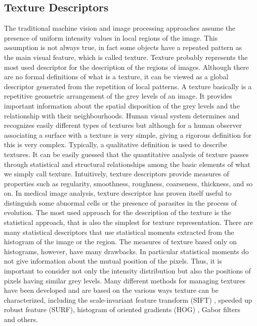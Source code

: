 \documentclass[final,a4paper,12pt,english]{UnicaPhdThesis3}
\begin{document}
\subsection{Texture Descriptors} %
The traditional machine vision and image processing approaches assume the presence of uniform intensity values in local regions of the image. This assumption is not always true, in fact some objects have a repeated pattern as the main visual feature, which is called texture. Texture probably represents the most used descriptor for the description of the regions of images. Although there are no formal definitions of what is a texture, it can be viewed as a global descriptor generated from the repetition of local patterns. A texture basically is a repetitive geometric arrangement of the grey levels of an image. It provides important information about the spatial disposition of the grey levels and the relationship with their neighbourhoods. Human visual system determines and recognizes easily different types of textures but although for a human observer associating a surface with a texture is very simple, giving a rigorous definition for this is very complex. Typically, a qualitative definition is used to describe textures. It can be easily guessed that the quantitative analysis of texture passes through statistical and structural relationships among the basic elements of what we simply call texture. Intuitively, texture descriptors provide measures of properties such as regularity, smoothness, roughness, coarseness, thickness, and so on. In medical image analysis, texture descriptor has proven itself useful to distinguish some abnormal cells or the presence of parasites in the process of evolution. The most used approach for the description of the texture is the statistical approach, that is also the simplest for texture representation. There are many statistical descriptors that use statistical moments extracted from the histogram of the image or the region. The measures of texture based only on histograms, however, have many drawbacks. In particular statistical moments do not give information about the mutual position of the pixels. Thus, it is important to consider not only the intensity distribution but also the positions of pixels having similar grey levels. Many different methods for managing textures have been developed and are based on the various ways texture can be characterized, including the scale-invariant feature transform (SIFT) \cite{Lowe}, speeded up robust feature (SURF)\cite{Bay}, histogram of oriented gradients (HOG) \cite{Dalal}, Gabor filters \cite{Jain} and others.
\end{document}
